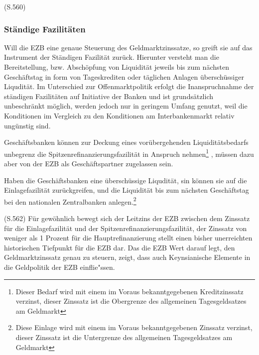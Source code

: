 \documentclass[
  onecolumn,
  a4paper,
  abstracton,
  parskip=half
  ,final
  ]{scrartcl}
\begin{document}
(S.560)

\citep[vgl.][S.560ff]{Basseler2010}
\subsubsection{St{\"a}ndige Fazilit{\"a}ten}

Will die EZB eine genaue Steuerung des Geldmarktzinssatze, so greift sie auf das Instrument der St{\"a}ndigen Fazilit{\"a}t zur{\"u}ck. Hierunter versteht man die Bereitstellung, bzw. Absch{\"o}pfung von Liquidit{\"a}t jeweils bis zum n{\"a}chsten Gesch{\"a}ftstag in form von Tageskrediten oder t{\"a}glichen Anlagen {\"u}bersch{\"u}ssiger Liqudit{\"a}t. Im Unterschied zur Offenmarktpolitik erfolgt die Inanspruchnahme der st{\"a}ndigen Fazilit{\"a}ten auf Initiative der Banken und ist grunds{\"a}tzlich unbeschr{\"a}nkt m{\"o}glich, werden jedoch nur in geringem Umfang genutzt, weil die Konditionen im Vergleich zu den Konditionen am Interbankenmarkt relativ ung{\"u}nstig sind.

Gesch{\"a}ftsbanken k{\"o}nnen zur Deckung eines vor{\"u}bergehenden Liquidit{\"a}tsbedarfs unbegrenz die Spitzenrefinanzierungsfazilit{\"a}t in Anspruch nehmen\footnote[36]{Dieser Bedarf wird mit einem im Voraus bekanntgegebenen Kreditzinssatz verzinst, dieser Zinssatz ist die Obergrenze des allgemeinen Tagesgeldsatzes am Geldmarkt}
, m{\"u}ssen dazu aber von der EZB als Gesch{\"a}ftspartner zugelassen sein.

Haben die Gesch{\"a}ftsbanken eine {\"u}bersch{\"u}ssige Liqudit{\"a}t, sin k{\"o}nnen sie auf die Einlagefazilit{\"a}t zur{\"u}ckgreifen, und die Liquidit{\"a}t bis zum n{\"a}chsten Gesch{\"a}ftstag bei den nationalen Zentralbanken anlegen.\footnote[37]{Diese Einlage wird mit einem im Voraus bekanntgegebenen Zinssatz verzinst, dieser Zinssatz ist die Untergrenze des allgemeinen Tagesgeldsatzes am Geldmarkt}

(S.562)
F{\"u}r gew{\"o}hnlich bewegt sich der Leitzins der EZB zwischen dem Zinssatz f{\"u}r die Einlagefazilit{\"a}t und der Spitzenrefinanzierungsfazilit{\"a}t, der Zinssatz von weniger als 1 Prozent f{\"u}r die Hauptrefinanzierung stellt einen bisher unerreichten historischen Tiefpunkt f{\"u}r die EZB dar.
Das die EZB Wert darauf legt, den Geldmarktzinssatz genau zu steuern, zeigt, dass auch Keynsianische Elemente in die Geldpolitik der EZB einflie{"ss}en.
\end{document}
